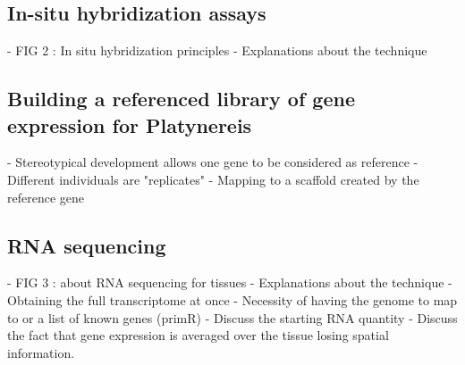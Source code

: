      \subsection{In-situ hybridization assays}
    - FIG 2 : In situ hybridization principles
    - Explanations about the technique 

     \subsection{Building a referenced library of gene expression for Platynereis}
         - Stereotypical development allows one gene to be considered as reference
    - Different individuals are "replicates"
    - Mapping to a scaffold created by the reference gene

     \subsection{RNA sequencing}
    - FIG 3 : about RNA sequencing for tissues
    - Explanations about the technique
    - Obtaining the full transcriptome at once
    - Necessity of having the genome to map to or a list of known genes (primR) 
    - Discuss the starting RNA quantity 
    - Discuss the fact that gene expression is averaged over the tissue losing spatial information.

%
%
%
%
%




